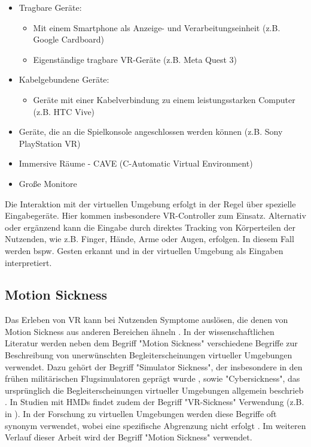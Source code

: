 \begin{itemize}
    \item Tragbare Geräte: 
    \begin{itemize}
        \item Mit einem Smartphone als Anzeige- und Verarbeitungseinheit (z.B. Google Cardboard)
        \item Eigenständige tragbare VR-Geräte (z.B. Meta Quest 3)
    \end{itemize}
    \item Kabelgebundene Geräte: 
    \begin{itemize}
        \item Geräte mit einer Kabelverbindung zu einem leistungsstarken Computer (z.B. HTC Vive)
    \end{itemize}
    \item Geräte, die an die Spielkonsole angeschlossen werden können (z.B. Sony PlayStation VR)
    \item Immersive Räume - CAVE (C-Automatic Virtual Environment)
    \item Große Monitore
\end{itemize}

Die Interaktion mit der virtuellen Umgebung erfolgt in der Regel über spezielle Eingabegeräte. Hier kommen insbesondere VR-Controller zum Einsatz. Alternativ oder ergänzend kann die Eingabe durch direktes Tracking von Körperteilen der Nutzenden, wie z.B. Finger, Hände, Arme oder Augen, erfolgen. In diesem Fall werden bspw. Gesten erkannt und in der virtuellen Umgebung als Eingaben interpretiert\citep{dorner_virtual_2019}.

\subsection{Motion Sickness}

Das Erleben von VR kann bei Nutzenden Symptome auslösen, die denen von Motion Sickness aus anderen Bereichen ähneln \citep{somrak_estimating_2019}. In der wissenschaftlichen Literatur werden neben dem Begriff "Motion Sickness" verschiedene Begriffe zur Beschreibung von unerwünschten Begleiterscheinungen virtueller Umgebungen verwendet. Dazu gehört der Begriff "Simulator Sickness", der insbesondere in den frühen militärischen Flugsimulatoren geprägt wurde \citep{kennedy_simulator_1993}, sowie "Cybersickness", das ursprünglich die Begleiterscheinungen virtueller Umgebungen allgemein beschrieb \citep{mccauley_cybersickness_1992}. In Studien mit HMDs findet zudem der Begriff "VR-Sickness" Verwendung (z.B. in \citep{kim_virtual_2018}). In der Forschung zu virtuellen Umgebungen werden diese Begriffe oft synonym verwendet, wobei eine spezifische Abgrenzung nicht erfolgt \citep{saredakis_factors_2020}. Im weiteren Verlauf dieser Arbeit wird der Begriff "Motion Sickness" verwendet. 

